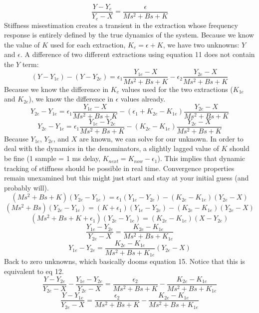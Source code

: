 \documentclass[10pt]{article}
\begin{document}
\begin{equation}
\frac{Y-Y_e}{Y_e-X}=\frac{\epsilon}{Ms^2+Bs+K}
\end{equation}
Stiffness misestimation creates a transient in the extraction whose frequency response is entirely defined by the true dynamics of the system. Because we know the value of $K$ used for each extraction, $K_e=\epsilon+K$, we have two unknowns: $Y$ and $\epsilon$. A difference of two different extractions using equation 11 does not contain the $Y$ term:
\begin{equation}
(Y-Y_{1e})-(Y-Y_{2e})=\epsilon_1 \frac{Y_{1e}-X}{Ms^2+Bs+K}- \epsilon_2 \frac{Y_{2e}-X}{Ms^2+Bs+K}
\end{equation}
Because we know the difference in $K_e$ values used for the two extractions ($K_{1e}$ and $K_{2e}$), we know the difference in $\epsilon$ values already.
\begin{equation}
Y_{2e}-Y_{1e}=\epsilon_1 \frac{Y_{1e}-X}{Ms^2+Bs+K}-(\epsilon_1+K_{2e}-K_{1e}) \frac{Y_{2e}-X}{Ms^2+Bs+K}
\end{equation}
\begin{equation}
Y_{2e}-Y_{1e}=\epsilon_1 \frac{Y_{1e}-Y_{2e}}{Ms^2+Bs+K}-(K_{2e}-K_{1e}) \frac{Y_{2e}-X}{Ms^2+Bs+K}
\end{equation}
Because $Y_{1e}$, $Y_{2e}$, and $X$ are known, we can solve for our unknown. In order to deal with the dynamics in the denominators, a slightly lagged value of $K$ should be fine (1 sample = 1 ms delay, $K_{next}=K_{now}-\epsilon_1$). This implies that dynamic tracking of stiffness should be possible in real time. Convergence properties remain unexamined but this might just start and stay at your initial guess (and probably will).
\begin{equation}
(Ms^2+Bs+K)(Y_{2e}-Y_{1e})=\epsilon_1 (Y_{1e}-Y_{2e})-(K_{2e}-K_{1e})(Y_{2e}-X)
\end{equation}
\begin{equation}
(Ms^2+Bs)(Y_{2e}-Y_{1e})=(K+\epsilon_1)(Y_{1e}-Y_{2e})-(K_{2e}-K_{1e})(Y_{2e}-X)
\end{equation}
\begin{equation}
(Ms^2+Bs+K+\epsilon_1)(Y_{2e}-Y_{1e})=(K_{2e}-K_{1e})(X-Y_{2e})
\end{equation}
\begin{equation}
\frac{Y_{1e}-Y_{2e}}{Y_{2e}-X}=\frac{K_{2e}-K_{1e}}{Ms^2+Bs+K_{1e}}
\end{equation}
\begin{equation}
Y_{1e}-Y_{2e}=\frac{K_{2e}-K_{1e}}{Ms^2+Bs+K_{1e}}(Y_{2e}-X)
\end{equation}
Back to zero unknowns, which basically dooms equation 15. Notice that this is equivalent to eq 12.
\begin{equation}
\frac{Y-Y_{2e}}{Y_{2e}-X}-\frac{Y_{1e}-Y_{2e}}{Y_{2e}-X}=\frac{\epsilon_2}{Ms^2+Bs+K}-\frac{K_{2e}-K_{1e}}{Ms^2+Bs+K_{1e}}
\end{equation}
\begin{equation}
\frac{Y-Y_{1e}}{Y_{2e}-X}=\frac{\epsilon_2}{Ms^2+Bs+K}-\frac{K_{2e}-K_{1e}}{Ms^2+Bs+K_{1e}}
\end{equation}
\end{document}
